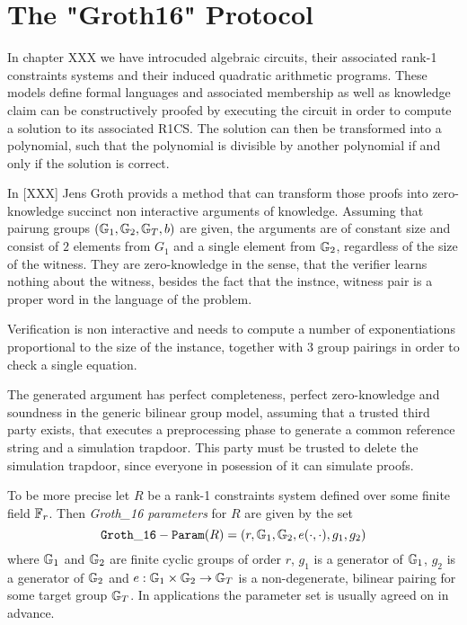 \section{The "Groth16" Protocol} In chapter XXX we have introcuded algebraic circuits, their associated rank-1 constraints systems and their induced quadratic arithmetic programs. These models define formal languages and associated membership as well as knowledge claim can be constructively proofed by executing the circuit in order to compute a solution to its associated R1CS. The solution can then be transformed into a polynomial, such that the polynomial is divisible by another polynomial if and only if the solution is correct. 
 
In [XXX] Jens Groth provids a method that can transform those proofs into zero-knowledge succinct non interactive arguments of knowledge. Assuming that pairung groups $(\mathbb{G}_1,\mathbb{G}_2,\mathbb{G}_T,b)$ are given, the arguments are of constant size and consist of $2$ elements from $G_1$ and a single element from $\mathbb{G}_2$, regardless of the size of the witness. They are zero-knowledge in the sense, that the verifier learns nothing about the witness, besides the fact that the instnce, witness pair is a proper word in the language of the problem.

Verification is non interactive and needs to compute a number of exponentiations proportional to the size of the instance, together with $3$ group pairings in order to check a single equation.

The generated argument has perfect completeness, perfect zero-knowledge and soundness in the generic bilinear group model, assuming that a trusted third party exists, that executes a preprocessing phase to generate a common reference string and a simulation trapdoor. This party must be trusted to delete the simulation trapdoor, since everyone in posession of it can simulate proofs. 

To be more precise let $R$ be a rank-1 constraints system defined over some finite field $\mathbb{F}_r$. Then \textit{Groth\_16 parameters} for $R$ are given by the set
\begin{equation}
\mathtt{Groth\_16-Param}(R)=(r, \mathbb{G}_1, \mathbb{G}_2, e(\cdot,\cdot), g_1,g_2)
\end{equation}
where $\mathbb{G}_1$ and $\mathbb{G}_2$ are finite cyclic groups of order $r$, $g_1$ is a generator of $\mathbb{G}_1$, $g_2$ is a generator of $\mathbb{G}_2$ and $e: \mathbb{G}_1 \times \mathbb{G}_2 \to \mathbb{G}_T$ is a non-degenerate, bilinear pairing for some target group $\mathbb{G}_T$. In applications the parameter set is usually agreed on in advance. 

